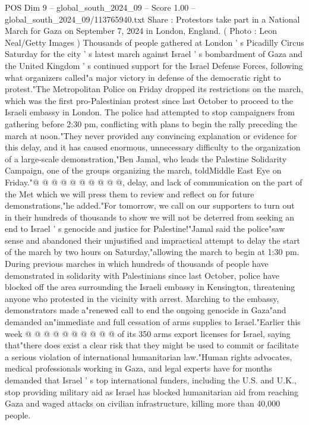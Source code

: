 \begin{textsample}{POS Dim 9 – global\_south\_2024\_09 – Score 1.00 – global\_south\_2024\_09/113765940.txt}  \label{ex:f9_pos_255}
Share : Protestors take part in a National March for Gaza on September 7, 2024 in London, England. ( Photo : Leon Neal/Getty Images ) Thousands of people gathered at London ' s Picadilly Circus Saturday for the city ' s latest march against Israel ' s bombardment of Gaza and the United Kingdom ' s continued support for the Israel Defense Forces, following what organizers called"a major victory in defense of the democratic right to protest."The Metropolitan Police on Friday dropped its restrictions on the march, which was the first pro-Palestinian protest since last October to proceed to the Israeli embassy in London.
The police had attempted to stop campaigners from gathering before 2:30 pm, conflicting with plans to begin the rally preceding the march at noon."They never provided any convincing explanation or evidence for this delay, and it has caused enormous, unnecessary difficulty to the organization of a large-scale demonstration,"Ben Jamal, who leads the Palestine Solidarity Campaign, one of the groups organizing the march, toldMiddle East Eye on Friday."@ @ @ @ @ @ @ @ @ @, delay, and lack of communication on the part of the Met which we will press them to review and reflect on for future demonstrations,"he added."For tomorrow, we call on our supporters to turn out in their hundreds of thousands to show we will not be deterred from seeking an end to Israel ' s genocide and justice for Palestine!"Jamal said the police"saw sense and abandoned their unjustified and impractical attempt to delay the start of the march by two hours on Saturday,"allowing the march to begin at 1:30 pm.
During previous marches in which hundreds of thousands of people have demonstrated in solidarity with Palestinians since last October, police have blocked off the area surrounding the Israeli embassy in Kensington, threatening anyone who protested in the vicinity with arrest.
Marching to the embassy, demonstrators made a"renewed call to end the ongoing genocide in Gaza"and demanded an"immediate and full cessation of arms supplies to Israel."Earlier this week @ @ @ @ @ @ @ @ @ @ of its 350 arms export licenses for Israel, saying that"there does exist a clear risk that they might be used to commit or facilitate a serious violation of international humanitarian law."Human rights advocates, medical professionals working in Gaza, and legal experts have for months demanded that Israel ' s top international funders, including the U.S. and U.K., stop providing military aid as Israel has blocked humanitarian aid from reaching Gaza and waged attacks on civilian infrastructure, killing more than 40,000 people.

\end{textsample}
